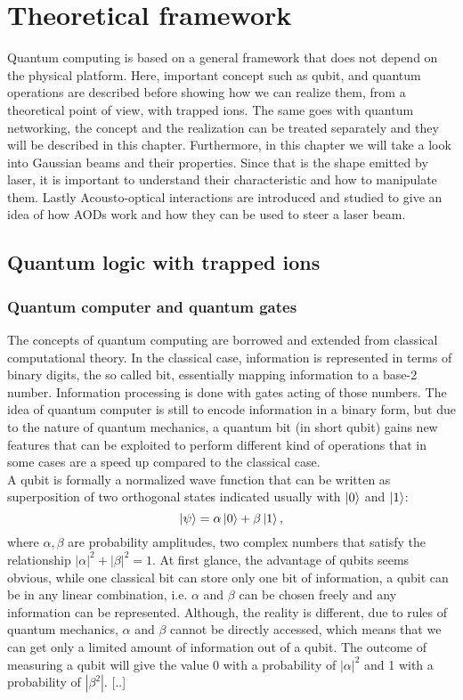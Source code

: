 \chapter{Theoretical framework}
Quantum computing is based on a general framework that does not depend on the physical platform. Here, important concept such as qubit, and quantum operations are described before showing how we can realize them, from a theoretical point of view, with trapped ions. The same goes with quantum networking, the concept and the realization can be treated separately and they will be described in this chapter. Furthermore, in this chapter we will take a look into Gaussian beams and their properties. Since that is the shape emitted by laser, it is important to understand their characteristic and how to manipulate them. Lastly Acousto-optical interactions are introduced and studied to give an idea of how AODs work and how they can be used to steer a laser beam.
\section{Quantum logic with trapped ions}
\subsection{Quantum computer and quantum gates}
The concepts of quantum computing are borrowed and extended from classical computational theory. In the classical case, information is represented in terms of binary digits, the so called bit, essentially mapping information to a base-2 number. Information processing is done with gates acting of those numbers. The idea of quantum computer is still to encode information in a binary form, but due to the nature of quantum mechanics, a quantum bit (in short qubit) gains new features that can be exploited to perform different kind of operations that in some cases are a speed up compared to the classical case.\\
A qubit is formally a normalized wave function that can be written as superposition of two orthogonal states indicated usually with $\ket{0}$ and $\ket{1}$:
\begin{equation}
\label{qubit}
\ket{\psi} = \alpha \ket{0} + \beta\ket{1},
\end{equation}
where $\alpha,\beta$ are probability amplitudes, two complex numbers that satisfy the relationship $|\alpha|^2+|\beta|^2 = 1$.
At first glance, the advantage of qubits seems obvious, while one classical bit can store only one bit of information, a qubit can be in any linear combination, i.e. $\alpha$ and $\beta$ can be chosen freely and any information can be represented. Although, the reality is different, due to rules of quantum mechanics, $\alpha$ and $\beta$ cannot be directly accessed, which means that we can get only a limited amount of information out of a qubit. The outcome of measuring a qubit will give the value 0 with a probability of $|\alpha|^2$ and 1 with a probability of $|\beta^2|$.  [..]


